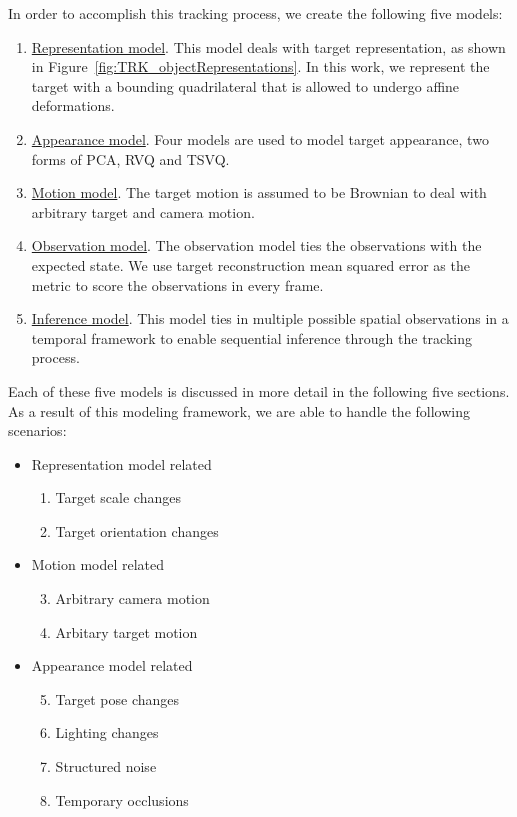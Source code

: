 In order to accomplish this tracking process, we create the following five models:

\begin{enumerate}
\item \underline{Representation model}.  This model deals with target representation, as shown in Figure~\ref{fig:TRK_objectRepresentations}.  In this work, we represent the target with a bounding quadrilateral that is allowed to undergo affine deformations.
\item \underline{Appearance model}.  Four models are used to model target appearance, two forms of PCA, RVQ and TSVQ.
\item \underline{Motion model}.  The target motion is assumed to be Brownian to deal with arbitrary target and camera motion.
\item \underline{Observation model}.  The observation model ties the observations with the expected state.  We use target reconstruction mean squared error as the metric to score the observations in every frame.
\item \underline{Inference model}.  This model ties in multiple possible spatial observations in a temporal framework to enable sequential inference through the tracking process.
\end{enumerate}

Each of these five models is discussed in more detail in the following five sections.  As a result of this modeling framework, we are able to handle the following scenarios:

\begin{itemize}
\item Representation model related
\begin{enumerate}
\item Target scale changes
\item Target orientation changes
\end{enumerate}
\item Motion model related
\begin{enumerate}\setcounter{enumi}{2}
\item Arbitrary camera motion
\item Arbitary target motion
\end{enumerate}
\item Appearance model related
\begin{enumerate}\setcounter{enumi}{4}
\item Target pose changes
\item Lighting changes
\item Structured noise
\item Temporary occlusions
\end{enumerate}
\end{itemize}


